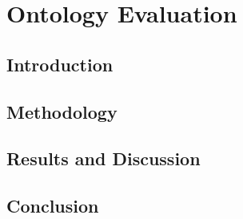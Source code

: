 \chapter{Ontology Evaluation} 
\label{chap:c}

\section{Introduction}

\section{Methodology}

\section{Results and Discussion}

\section{Conclusion}